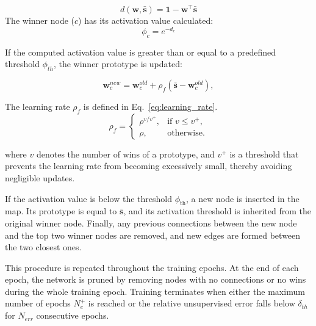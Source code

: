 \documentclass[letterpaper, 10 pt, conference]{ieeeconf}  %
\begin{document}
%
\begin{equation}
    \label{eq:distance}
    d(\mathbf{w}, \bar{\mathbf{s}}) = \mathbf{1} - \mathbf{w}^\top \bar{\mathbf{s}}
\end{equation}
%
The winner node ($c$) has its activation value calculated: 
%
\begin{equation}
    \label{eq:activation}
    \phi_{c}= e^{-d_{c}}
\end{equation}

If the computed activation value is greater than or equal to a predefined threshold $\phi_{th}$, the winner prototype is updated:

%
\begin{equation}
    \label{eq:prototype_update}
    \mathbf{w}^{new}_{c} = \mathbf{w}^{old}_{c} + \rho_f (\bar{\mathbf{s}} - \mathbf{w}^{old}_{c}),
\end{equation}

%
The learning rate $\rho_f$ is defined in Eq.~\eqref{eq:learning_rate}.
%
\begin{equation}
    \label{eq:learning_rate}
    \rho_f =
    \begin{cases}
        \rho^{v / v^+}, & \text{if } v \leq v^+, \\
        \rho,          & \text{otherwise}.
    \end{cases}
\end{equation}

\noindent
where $v$ denotes the number of wins of a prototype, and $v^+$ is a threshold
that prevents the learning rate from becoming excessively small, thereby
avoiding negligible updates.

If the activation value is below the threshold $\phi_{\text{th}}$, a new node is inserted in the map. Its prototype is equal to $\bar{\mathbf{s}}$, and its activation threshold is inherited from the original winner node. Finally, any previous connections between the new node and the top two winner nodes are removed, and new edges are formed between the two closest ones.  



This procedure is repeated throughout the training epochs. At the end of each epoch, the network is pruned by removing nodes with no connections or no wins during the whole training epoch. Training terminates when either the maximum number of epochs $N_e^+$ is reached or the relative unsupervised error falls below $\delta_{th}$ for $N_{err}$ consecutive epochs.
\end{document}
